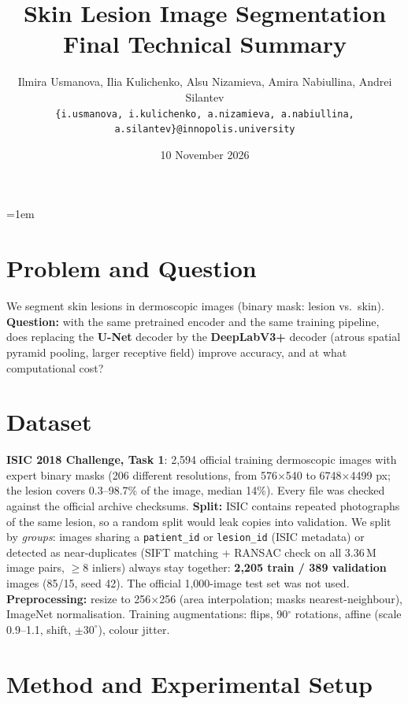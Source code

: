\documentclass[11pt,a4paper]{article}
\title{\vspace{-0.8cm}\textbf{Skin Lesion Image Segmentation}\\ \large Final Technical Summary}
\author{Ilmira Usmanova, Ilia Kulichenko, Alsu Nizamieva, Amira Nabiullina, Andrei Silantev\\
{\small\texttt{\{i.usmanova, i.kulichenko, a.nizamieva, a.nabiullina, a.silantev\}@innopolis.university}}}
\date{\vspace{-0.4cm}10 November 2026}
\begin{document}
\emergencystretch=1em
\maketitle
\vspace{-0.6cm}

\section{Problem and Question}

We segment skin lesions in dermoscopic images (binary mask: lesion vs.\ skin). \textbf{Question:} with the same
pretrained encoder and the same training pipeline, does replacing the \textbf{U-Net} decoder by the
\textbf{DeepLabV3+} decoder (atrous spatial pyramid pooling, larger receptive field) improve accuracy, and at what
computational cost?

\section{Dataset}

\textbf{ISIC 2018 Challenge, Task 1}: 2,594 official training dermoscopic images with expert binary masks
(206 different resolutions, from 576$\times$540 to 6748$\times$4499 px; the lesion covers 0.3--98.7\% of the
image, median 14\%). Every file was checked against the official archive checksums.
\textbf{Split:} ISIC contains repeated photographs of the same lesion, so a random split would leak copies into
validation. We split by \emph{groups}: images sharing a \texttt{patient\_id} or \texttt{lesion\_id} (ISIC metadata)
or detected as near-duplicates (SIFT matching + RANSAC check on all 3.36\,M image pairs, $\geq$8 inliers) always stay
together: \textbf{2,205 train / 389 validation} images (85/15, seed 42). The official 1,000-image test set was not used.
\textbf{Preprocessing:} resize to 256$\times$256 (area interpolation; masks nearest-neighbour), ImageNet normalisation.
Training augmentations: flips, 90$^\circ$ rotations, affine (scale 0.9--1.1, shift, $\pm30^\circ$), colour jitter.

\section{Method and Experimental Setup}
\end{document}
